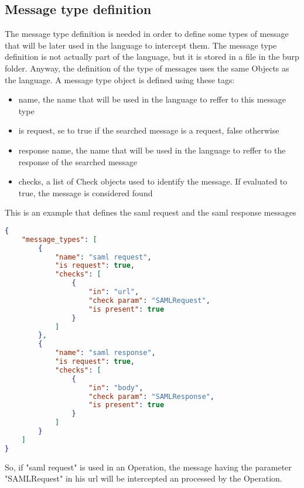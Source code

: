 \subsection{Message type definition}
The message type definition is needed in order to define some types of message that will be later used in the language to intercept them.
The message type definition is not actually part of the language, but it is stored in a file in the burp folder. Anyway, the definition of the type of messages uses the same Objects as the language.
A message type object is defined using these tags:
\begin{itemize}
    \item name, the name that will be used in the language to reffer to this message type
    \item is request, se to true if the searched message is a request, false otherwise
    \item response name, the name that will be used in the language to reffer to the response of the searched message
    \item checks, a list of Check objects used to identify the message. If evaluated to true, the message is considered found
\end{itemize}

This is an example that defines the saml request and the saml response messages
\begin{lstlisting}[language=json]
{
    "message_types": [
        {
            "name": "saml request",
            "is request": true,
            "checks": [
                {
                    "in": "url",
                    "check param": "SAMLRequest",
                    "is present": true
                }
            ]
        },
        {
            "name": "saml response",
            "is request": true,
            "checks": [
                {
                    "in": "body",
                    "check param": "SAMLResponse",
                    "is present": true
                }
            ]
        }
    ]
}
\end{lstlisting}
So, if "saml request" is used in an Operation, the message having the parameter "SAMLRequest" in his url will be intercepted an processed by the Operation.


